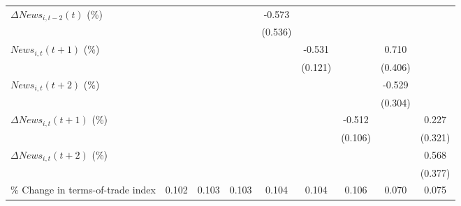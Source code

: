 {\begin{tabular}{l*{8}{c}}
\addlinespace
$ \Delta News_{i,t-2}(t)$ (\%)&                     &                     &                     &      -0.573         &                     &                     &                     &                     \\
                    &                     &                     &                     &     (0.536)         &                     &                     &                     &                     \\
\addlinespace
$ News_{i,t}(t+1)$ (\%)&                     &                     &                     &                     &      -0.531\sym{***}&                     &       0.710\sym{*}  &                     \\
                    &                     &                     &                     &                     &     (0.121)         &                     &     (0.406)         &                     \\
\addlinespace
$ News_{i,t}(t+2)$ (\%)&                     &                     &                     &                     &                     &                     &      -0.529         &                     \\
                    &                     &                     &                     &                     &                     &                     &     (0.304)         &                     \\
\addlinespace
$ \Delta News_{i,t}(t+1)$ (\%)&                     &                     &                     &                     &                     &      -0.512\sym{***}&                     &       0.227         \\
                    &                     &                     &                     &                     &                     &     (0.106)         &                     &     (0.321)         \\
\addlinespace
$ \Delta News_{i,t}(t+2)$ (\%)&                     &                     &                     &                     &                     &                     &                     &       0.568         \\
                    &                     &                     &                     &                     &                     &                     &                     &     (0.377)         \\
\addlinespace
\% Change in terms-of-trade index&       0.102\sym{*}  &       0.103\sym{*}  &       0.103\sym{*}  &       0.104\sym{*}  &       0.104\sym{*}  &       0.106\sym{*}  &       0.070         &       0.075\sym{*}  \\

\end{tabular}}
